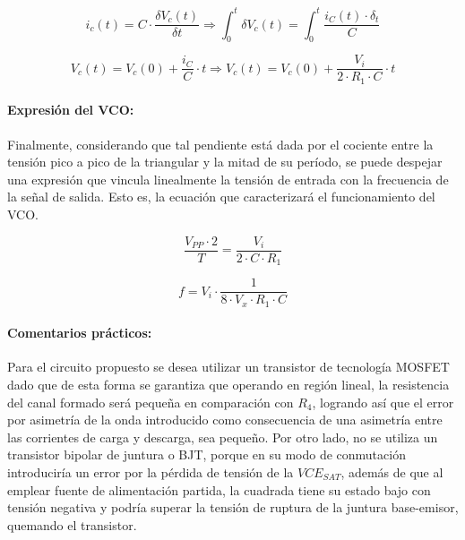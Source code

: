 \begin{equation*}
    i_c(t) = C \cdot \frac{\delta V_c(t)}{\delta t} \Rightarrow \int_0^{t} \delta V_c(t) = \int_0^{t} \frac{i_C(t) \cdot \delta_t}{C}
\end{equation*}

\begin{equation}
    V_c(t) = V_c(0) + \frac{i_C}{C} \cdot t \Rightarrow V_c(t) = V_c(0) + \frac{V_i}{2 \cdot R_1 \cdot C} \cdot t
\end{equation}

\paragraph{Expresi\'on del VCO:} Finalmente, considerando que tal pendiente est\'a dada por el cociente entre la tensi\'on pico a pico
de la triangular y la mitad de su per\'iodo, se puede despejar una expresi\'on que vincula linealmente la tensi\'on de entrada con la frecuencia de la se\~nal de salida. Esto es, la ecuaci\'on que caracterizar\'a el funcionamiento
del VCO.

\begin{equation*}
    \frac{V_{PP} \cdot 2}{T} = \frac{V_i}{2 \cdot C \cdot R_1}
\end{equation*}

\begin{equation}
    f = V_i \cdot \frac{1}{8 \cdot V_x \cdot R_1 \cdot C}
    \label{eq:ecuacion_caracteristica_vco}
\end{equation}

\paragraph{Comentarios pr\'acticos:} Para el circuito propuesto se desea utilizar un transistor de tecnolog\'ia MOSFET dado que de esta forma se garantiza que operando en regi\'on lineal,
la resistencia del canal formado ser\'a peque\~na en comparaci\'on con $R_4$, logrando as\'i que el error por asimetr\'ia de la onda introducido como consecuencia de una asimetr\'ia entre las corrientes
de carga y descarga, sea peque\~no. Por otro lado, no se utiliza un transistor bipolar de juntura o BJT, porque en su modo de conmutaci\'on introducir\'ia un error por la p\'erdida de tensi\'on de la $VCE_{SAT}$, adem\'as
de que al emplear fuente de alimentaci\'on partida, la cuadrada tiene su estado bajo con tensi\'on negativa y podr\'ia superar la tensi\'on de ruptura de la juntura base-emisor, quemando el transistor.


